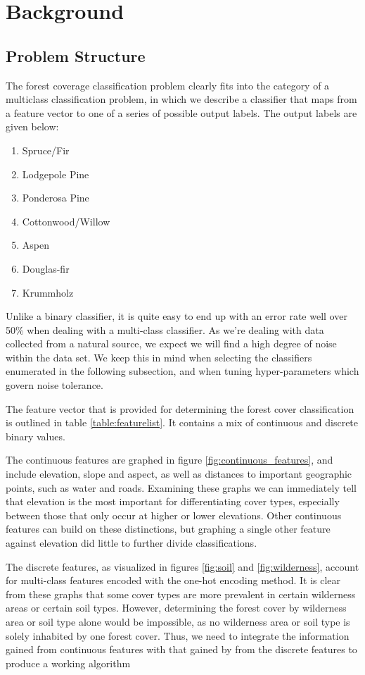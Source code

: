 \section{Background}
\label{sec:-back}
\subsection{Problem Structure}
The forest coverage classification problem clearly fits into the 
category of a multiclass classification problem, in which we describe 
a classifier that maps from a feature vector to one of a series of 
possible output labels. The output labels are given below:

\begin{enumerate}
\item Spruce/Fir
\item Lodgepole Pine
\item Ponderosa Pine
\item Cottonwood/Willow
\item Aspen
\item Douglas-fir
\item Krummholz
\end{enumerate}

Unlike a binary classifier, it is quite easy to end up with an 
error rate well over 50\% when dealing with a multi-class 
classifier.  As we're dealing with data collected from a natural source, we 
expect we will find a high degree of noise within the data set.  We keep 
this in mind when selecting the classifiers enumerated in the following 
subsection, and when tuning hyper-parameters which govern noise 
tolerance.

The feature vector that is provided for determining the forest
cover classification is outlined in table \ref{table:featurelist}.
It contains a mix of continuous and discrete binary
values.

The continuous features are graphed in figure \ref{fig:continuous_features},
and include elevation, slope and aspect, as well as distances to important
geographic points, such as water and roads. Examining these graphs we can
immediately tell that elevation is the most important for differentiating cover types,
especially between those that only occur at higher or lower elevations. Other
continuous features can build on these distinctions, but graphing a single other
feature against elevation did little to further divide classifications.

The discrete features, as visualized in figures \ref{fig:soil} 
and \ref{fig:wilderness}, account for multi-class features encoded with 
the one-hot encoding method. It is clear from these graphs that some cover types
are more prevalent in certain wilderness areas or certain soil types. However,
determining the forest cover by wilderness area or soil type alone would be
impossible, as no wilderness area or soil type is solely inhabited by one
forest cover. Thus, we need to integrate the information gained from continuous
features with that gained by from the discrete features to produce a working
algorithm

